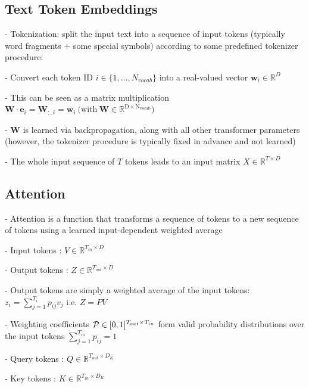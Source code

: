 \subsection*{Text Token Embeddings}

- Tokenization: split the input text into a sequence of input tokens (typically word fragments + some special symbols) according to some predefined tokenizer procedure: 

- Convert each token ID $i\in\{1,...,N_{vocab}\}$ into a real-valued vector $\mathbf{w}_{i}\in\mathbb{R}^{D}$

- This can be seen as a matrix multiplication $\mathbf{W}\cdot\mathbf{e}_{i}=\mathbf{W}_{:,i}=\mathbf{w}_{i}{\mathrm{~(with~\mathbf{W}\in\mathbb{R}^{D \times N_{vocab}}}})$


- $\mathbf{W}$ is learned via backpropagation, along with all other transformer parameters (however, the tokenizer procedure is typically fixed in advance and not learned)

- The whole input sequence of $T$ tokens leads to an input matrix $X\in\mathbb{R}^{T\times D}$

\subsection*{Attention}

- Attention is a function that transforms a sequence of tokens to a new sequence of tokens using a learned input-dependent weighted average

- Input tokens : $V\in\mathbb{R}^{T_{i n}\times D}$

- Output tokens : $Z\in\mathbb{R}^{T_{out}\times D}$

- Output tokens are simply a weighted average of
the input tokens:
$z_{i}=\sum_{j=1}^{T_{i}}p_{i j}v_{j}$ i.e. $Z=P V$

- Weighting coefficients ${\cal P}\in[0,1]^{T_{out}\times T_{i n}}$ form valid probability distributions over the input tokens $\textstyle\sum_{j=1}^{T_{i n}}p_{i j}=1$

- Query tokens : $Q\in\mathbb{R}^{T_{out}\times D_{K}}$

- Key tokens : $K\in\mathbb{R}^{T_{in}\times D_{K}}$

